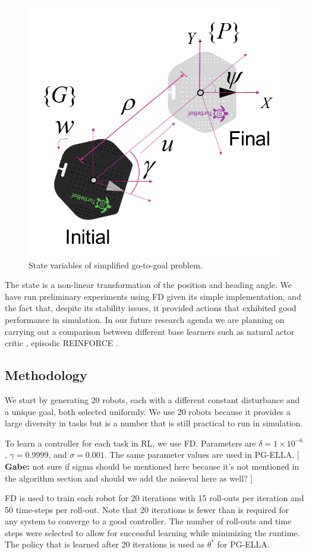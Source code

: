 \documentclass{aamas2016}
\newcommand{\note}[3]{{\color{#2} [ \ding{42} \textbf{#1:} {\small #3} ]}}
\newcommand{\comGabe}[1]{\note{Gabe}{cyan}{#1}}
\begin{document}
\begin{figure}[!htbp]
    \centering
        \includegraphics[width=.45\textwidth]{images/unicycle.png}
        \caption{State variables of simplified go-to-goal problem.}\label{fig:numfeat}
\end{figure}
The state is a non-linear transformation of the position and heading angle. We have run preliminary experiments using FD \cite{Bagnell-2013} given its simple implementation, and the fact that, despite its stability issues, it provided actions that exhibited good performance in simulation. In our future research agenda we are planning on carrying out a comparison between different base learners such as natural actor critic \cite{peters2008natural}, episodic REINFORCE \cite{williams1992simple}.

\subsection{Methodology}
We start by generating 20 robots, each with a different constant disturbance and a unique goal, both selected uniformly. 
We use 20 robots because it provides a large diversity in tasks but is a number that is still practical to run in simulation. 

To learn a controller for each task in RL, we use FD. Parameters are $\delta=1\times 10^{-6}$, $\gamma=0.9999$, and $\sigma=0.001$. 
The same parameter values are used in PG-ELLA.\comGabe{not sure if sigma should be mentioned here because it's not mentioned in the algorithm section and should we add the noiseval here as well?}

FD is used to train each robot for 20 iterations with 15 roll-outs per iteration and 50 time-steps per roll-out.
Note that 20 iterations is fewer than is required for any system to converge to a good controller. 
The number of roll-outs and time steps were selected to allow for successful learning while minimizing the runtime. 
The policy that is learned after 20 iterations is used as $\theta^*$ for PG-ELLA. %
\end{document}
